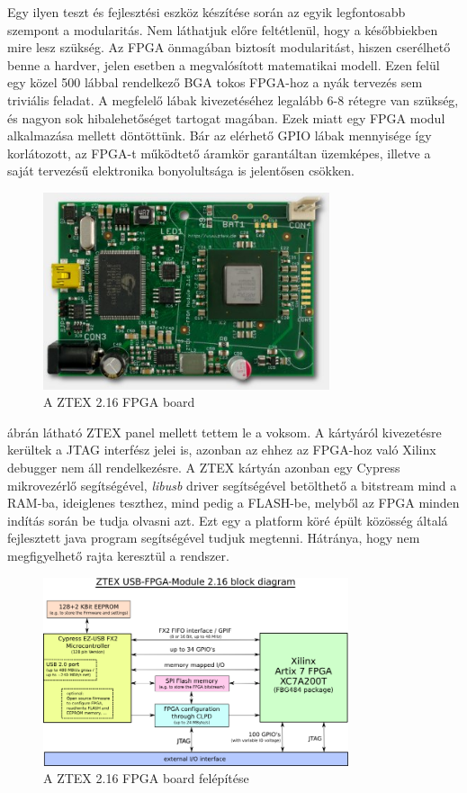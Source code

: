 Egy ilyen teszt és fejlesztési eszköz készítése során az egyik legfontosabb szempont a modularitás. Nem láthatjuk előre feltétlenül, hogy a későbbiekben mire lesz szükség. Az FPGA önmagában biztosít modularitást, hiszen cserélhető benne a hardver, jelen esetben a megvalósított matematikai modell. Ezen felül egy közel 500 lábbal rendelkező BGA tokos FPGA-hoz a nyák tervezés sem triviális feladat. A megfelelő lábak kivezetéséhez legalább 6-8 rétegre van szükség, és nagyon sok hibalehetőséget tartogat magában. Ezek miatt egy FPGA modul alkalmazása mellett döntöttünk. Bár az elérhető GPIO lábak mennyisége így korlátozott, az FPGA-t működtető áramkör garantáltan üzemképes, illetve a saját tervezésű elektronika bonyolultsága is jelentősen csökken.

\begin{figure}[!ht]
	\centering
	\includegraphics[width = 0.75\textwidth]{figures/fpga216.jpg}
	\caption{A ZTEX 2.16 FPGA board} 
	\label{fig:ztex}
\end{figure}

 ábrán látható ZTEX panel mellett tettem le a voksom. A kártyáról kivezetésre kerültek a JTAG interfész jelei is, azonban az ehhez az FPGA-hoz való Xilinx debugger nem áll rendelkezésre. A ZTEX kártyán azonban egy Cypress mikrovezérlő segítségével, \emph{libusb} driver segítségével betölthető a bitstream mind a RAM-ba, ideiglenes teszthez, mind pedig a FLASH-be, melyből az FPGA minden indítás során be tudja olvasni azt. Ezt egy a platform köré épült közösség általá fejlesztett java program segítségével tudjuk megtenni. Hátránya, hogy nem megfigyelhető rajta keresztül a rendszer.


\begin{figure}[!ht]
	\centering
	\includegraphics[width = 0.8\textwidth]{figures/usb-fpga-216.png}
	\caption{A ZTEX 2.16 FPGA board felépítése} 
	\label{fig:ztex_block}
\end{figure}


